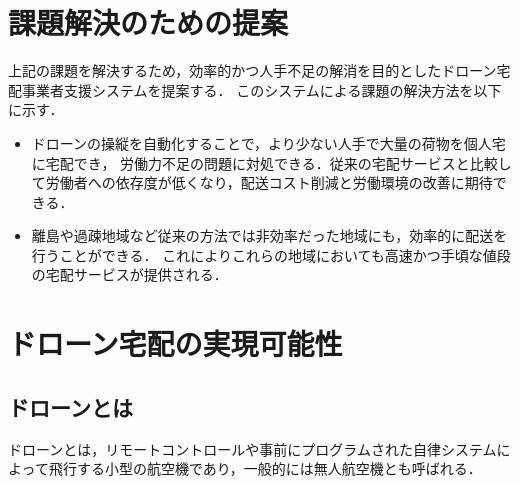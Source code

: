 \documentclass[a4paper, titlepage]{jsarticle}
\begin{document}
\section{課題解決のための提案}
上記の課題を解決するため，効率的かつ人手不足の解消を目的としたドローン宅配事業者支援システムを提案する．
このシステムによる課題の解決方法を以下に示す．
\begin{itemize}
  \item ドローンの操縦を自動化することで，より少ない人手で大量の荷物を個人宅に宅配でき，
        労働力不足の問題に対処できる．従来の宅配サービスと比較して労働者への依存度が低くなり，配送コスト削減と労働環境の改善に期待できる．
  \item 離島や過疎地域など従来の方法では非効率だった地域にも，効率的に配送を行うことができる．
        これによりこれらの地域においても高速かつ手頃な値段の宅配サービスが提供される．



\end{itemize}

\section{ドローン宅配の実現可能性}
\subsection{ドローンとは}
ドローンとは，リモートコントロールや事前にプログラムされた自律システムによって飛行する小型の航空機であり，一般的には無人航空機とも呼ばれる．
\end{document}
